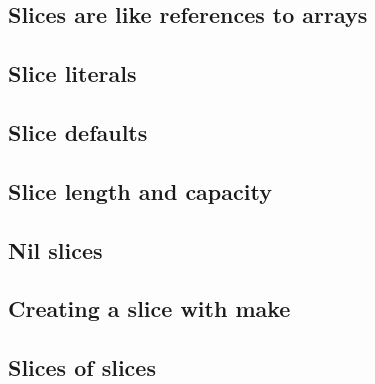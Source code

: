 \subsection{Slices are like references to arrays}




\subsection{Slice literals}




\subsection{Slice defaults}




\subsection{Slice length and capacity}




\subsection{Nil slices}




\subsection{Creating a slice with make}




\subsection{Slices of slices}




